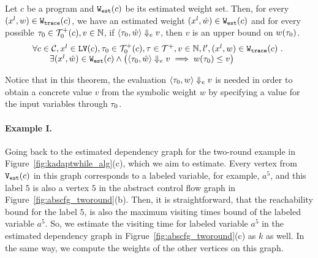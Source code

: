 \begin{thm}
 \label{thm:addweight_soundness}
Let ${c}$ be a program and $\mathtt{{W_{est}}}(c)$ be its estimated weight set.
Then, for every  $(x^l, w) \in \mathtt{{W_{trace}}}(c) $,
we have an estimated weight $(x^l, \hat{w}) \in \mathtt{{W_{est}}}(c)$ and for every possible 
$\mathtt{\tau}_0 \in \mathcal{T}^{+}_0(c),
v \in \mathbb{N}$,
if $\langle \mathtt{\tau}_0, \hat{w} \rangle \Downarrow_e v$,
then $v$ is an upper bound on ${w}(\mathtt{\tau}_0)$.
\[
 \begin{array}{l}
 \forall c \in \mathcal{C}, x^l \in \mathtt{LV}(c),\mathtt{\tau}_0 \in \mathcal{T}^{+}_0(c), \mathtt{\tau} \in \mathcal{T}^{+},
v \in \mathbb{N}, l', (x^l, w) \in \mathtt{{W_{trace}}}(c) ~.~
\\ \qquad 
\exists
(x^l, \hat{w}) \in \mathtt{{W_{est}}}(c) 
\land
\big(
 \langle \mathtt{\tau}_0, \hat{w} \rangle \Downarrow_e v \implies w(\mathtt{\tau}_0) \leq v
\big)
\end{array}
\]
\end{thm}
Notice that in this theorem, the evaluation $\langle \mathtt{\tau}_0, w \rangle \Downarrow_e v$ is needed in order to obtain a concrete value $v$ from the symbolic weight $w$ by specifying a value for the input variables through $\mathtt{\tau}_0$.


\paragraph{Example I.}
Going back to the
estimated dependency graph for the two-round example in
Figure~\ref{fig:kadaptwhile_alg}(c), which we aim to estimate.
%
Every vertex from $\mathtt{{V_{est}}}(c)$ in this graph corresponds to a labeled variable, for example, $a^5$,
and this label $5$ is also a vertex $5$ in the abstract control flow graph in Figure~\ref{fig:abscfg_tworound}(b).
%
Then, it is straightforward, 
that the reachability bound for the label $5$, 
is also the maximum visiting times bound of the labeled variable $a^5$.
So, we estimate the visiting time for labeled variable $a^5$ in the estimated dependency graph in Figrue~\ref{fig:abscfg_tworound}(c) as $k$ as well.
%
In the same way, we compute the weights of the other vertices on this graph.

